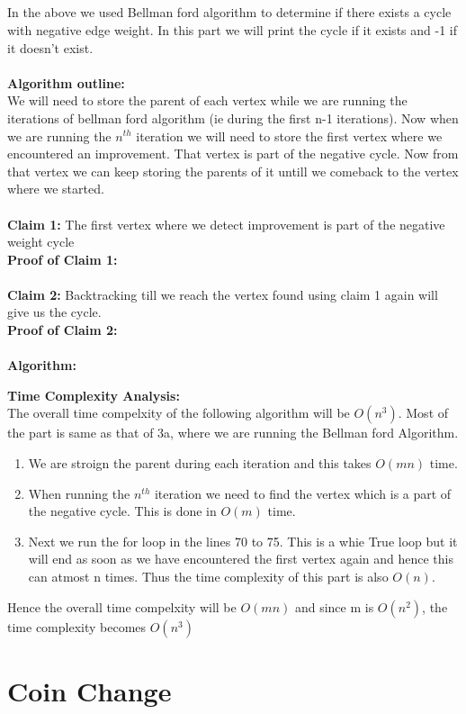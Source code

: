 \documentclass{article}
\begin{document}
\subsection{}
In the above we used Bellman ford algorithm to determine if there exists a cycle with negative edge weight. In this part we will print the cycle if it exists and -1 if it doesn't exist.
\\\\
\textbf{Algorithm outline:}\\
We will need to store the parent of each vertex while we are running the iterations of bellman ford algorithm (ie during the first n-1 iterations). Now when we are running the $n^{th}$ iteration we will need to store the first vertex where we encountered an improvement. That vertex is part of the negative cycle. Now from that vertex we can keep storing the parents of it untill we comeback to the vertex where we started.
\\\\
\textbf{Claim 1:} The first vertex where we detect improvement is part of the negative weight cycle\\
\textbf{Proof of Claim 1:}
\\\\
\textbf{Claim 2:} Backtracking till we reach the vertex found using claim 1 again will give us the cycle.\\
\textbf{Proof of Claim 2:}
\\\\
\textbf{Algorithm:}

\textbf{Time Complexity Analysis:}\\
The overall time compelxity of the following algorithm will be $O(n^3)$. Most of the part is same as that of 3a, where we are running the Bellman ford Algorithm.
\begin{enumerate}
    \item We are stroign the parent during each iteration and this takes $O(mn)$ time. 
    \item When running the $n^{th}$ iteration we need to find the vertex which is a part of the negative cycle. This is done in $O(m)$ time.
    \item Next we run the for loop in the lines 70 to 75. This is a whie True loop but it will end as soon as we have encountered the first vertex again and hence this can atmost n times. Thus the time complexity of this part is also $O(n)$.
\end{enumerate}
Hence the overall time compelxity will be $O(mn)$ and since m is $O(n^2)$, the time complexity becomes $O(n^3)$



\section{Coin Change}
\end{document}
